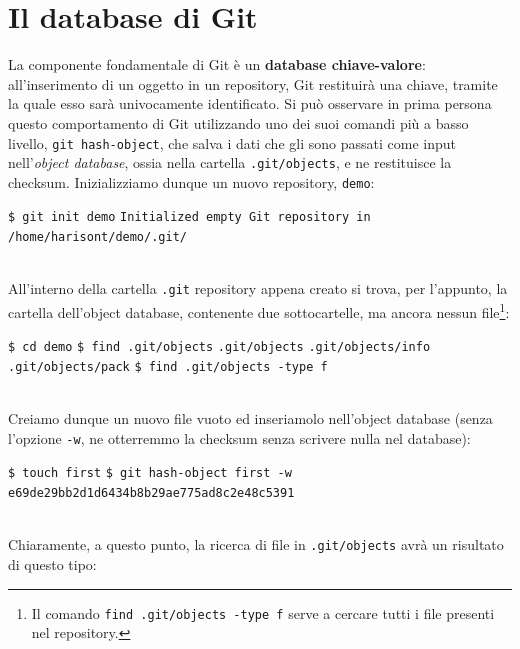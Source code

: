 \documentclass[12pt]{article}
\def\code#1{\texttt{#1}}
\begin{document}
\section{Il database di Git} \label{quarta sezione}%
La componente fondamentale di Git è un \textbf{database chiave-valore}: all'inserimento di un oggetto in un repository, Git restituirà una chiave, tramite la quale esso sarà univocamente identificato. 
Si può osservare in prima persona questo comportamento di Git utilizzando uno dei suoi comandi più a basso livello, \code{git hash-object}, che salva i dati che gli sono passati come input nell'\textit{object database}, ossia nella cartella \code{.git/objects}, e ne restituisce la checksum.
Inizializziamo dunque un nuovo repository, \code{demo}:
\begin{algorithm*}
	\begin{algorithmic}
		\State \code{\$ git init demo}
		\State \code{Initialized empty Git repository in /home/harisont/demo/.git/}	
	\end{algorithmic}
\end{algorithm*}
\\All'interno della cartella \code{.git} repository appena creato si trova, per l'appunto, la cartella dell'object database, contenente due sottocartelle, ma ancora nessun file\footnote{Il comando \code{find .git/objects -type f} serve a cercare tutti i file presenti nel repository.}:
\begin{algorithm*}
	\begin{algorithmic}
		\State \code{\$ cd demo}
		\State \code{\$ find .git/objects}	
		\State \code{.git/objects}	
		\State \code{.git/objects/info}
		\State \code{.git/objects/pack}
		\State \code{\$ find .git/objects -type f}
		\State \code{ \ }
	\end{algorithmic}
\end{algorithm*}
\bigskip \\Creiamo dunque un nuovo file vuoto ed inseriamolo nell'object database (senza l'opzione \code{-w}, ne otterremmo la checksum senza scrivere nulla nel database):
\begin{algorithm*}
	\begin{algorithmic}
		\State \code{\$ touch first}
		\State \code{\$ git hash-object first -w}	
		\State \code{e69de29bb2d1d6434b8b29ae775ad8c2e48c5391}	
	\end{algorithmic}
\end{algorithm*}
\bigskip \\
Chiaramente, a questo punto, la ricerca di file in \code{.git/objects} avrà un risultato di questo tipo:
\end{document}
